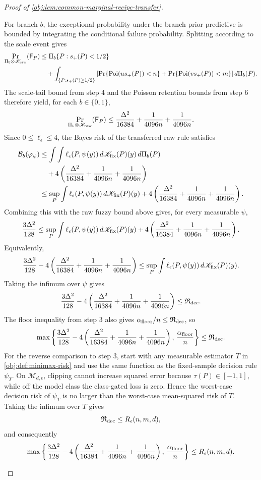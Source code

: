 \begin{proof}[Proof of \cref{obj:lem:common-marginal-recipe-transfer}]
\begin{enumerate}
For branch \(b\), the exceptional probability under the branch prior predictive is bounded by integrating the conditional failure probability.  Splitting according to the scale event gives
\[
\begin{aligned}
\Pr_{\Pi_b\otimes\mathscr K_{\rm raw}}(\mathsf F_P)
&\le
\Pi_b\{P:s_+(P)<1/2\} \\
&\quad+
\int_{\{P:s_+(P)\ge1/2\}}
\left[
\Pr\{\operatorname{Poi}(u s_+(P))<n\}
+
\Pr\{\operatorname{Poi}(v s_+(P))<m\}
\right]d\Pi_b(P).
\end{aligned}
\]
The scale-tail bound from step 4 and the Poisson retention bounds from step 6 therefore yield, for each \(b\in\{0,1\}\),
\[
\Pr_{\Pi_b\otimes\mathscr K_{\rm raw}}(\mathsf F_P)
\le
\frac{\Delta^2}{16384}
+\frac1{4096n}
+\frac1{4096n}.
\]
Since \(0\le\ell_\epsilon\le4\), the Bayes risk of the transferred raw rule satisfies
\[
\begin{aligned}
\mathcal B_b(\varphi_\psi)
&\le
\int
\int \ell_\epsilon(P,\psi(y))\,d\mathscr K_{\rm fix}(P)(y)\,d\Pi_b(P)\\
&\quad+
4\left(
\frac{\Delta^2}{16384}
+\frac1{4096n}
+\frac1{4096n}
\right)\\
&\le
\sup_{P}\int \ell_\epsilon(P,\psi(y))\,d\mathscr K_{\rm fix}(P)(y)
+
4\left(
\frac{\Delta^2}{16384}
+\frac1{4096n}
+\frac1{4096n}
\right).
\end{aligned}
\]
Combining this with the raw fuzzy bound above gives, for every measurable \(\psi\),
\[
\frac{3\Delta^2}{128}
\le
\sup_{P}\int \ell_\epsilon(P,\psi(y))\,d\mathscr K_{\rm fix}(P)(y)
+
4\left(
\frac{\Delta^2}{16384}
+\frac1{4096n}
+\frac1{4096n}
\right).
\]
Equivalently,
\[
\frac{3\Delta^2}{128}
-
4\left(
\frac{\Delta^2}{16384}
+\frac1{4096n}
+\frac1{4096n}
\right)
\le
\sup_{P}\int \ell_\epsilon(P,\psi(y))\,d\mathscr K_{\rm fix}(P)(y).
\]
Taking the infimum over \(\psi\) gives
\[
\frac{3\Delta^2}{128}
-
4\left(
\frac{\Delta^2}{16384}
+\frac1{4096n}
+\frac1{4096n}
\right)
\le
\mathfrak R_{\rm dec}.
\]
The floor inequality from step 3 also gives \(\alpha_{\rm floor}/n\le\mathfrak R_{\rm dec}\), so
\[
\max\left\{
\frac{3\Delta^2}{128}
-
4\left(
\frac{\Delta^2}{16384}
+\frac1{4096n}
+\frac1{4096n}
\right),
\,
\frac{\alpha_{\rm floor}}{n}
\right\}
\le
\mathfrak R_{\rm dec}.
\]
For the reverse comparison to step 3, start with any measurable estimator \(T\) in
\cref{obj:def:minimax-risk} and use the same function as the fixed-sample decision rule
\(\psi_T\).  On \(\mathcal M_{d,\epsilon}\), clipping cannot increase squared error because
\(\tau(P)\in[-1,1]\), while off the model class the class-gated loss is zero.  Hence the
worst-case decision risk of \(\psi_T\) is no larger than the worst-case mean-squared risk of
\(T\).  Taking the infimum over \(T\) gives
\[
\mathfrak R_{\rm dec}
\le
R_\epsilon(n,m,d),
\]
and consequently
\[
\max\left\{
\frac{3\Delta^2}{128}
-
4\left(
\frac{\Delta^2}{16384}
+\frac1{4096n}
+\frac1{4096n}
\right),
\,
\frac{\alpha_{\rm floor}}{n}
\right\}
\le
R_\epsilon(n,m,d).
\] %


\end{enumerate}
\end{proof}
